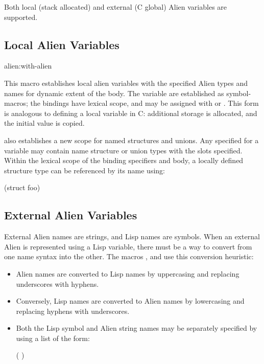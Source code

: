Both local (stack allocated) and external (C global) Alien variables are
supported.


\subsection{Local Alien Variables}

\begin{defmac}{alien:}{with-alien}{ }
  
  This macro establishes local alien variables with the specified
  Alien types and names for dynamic extent of the body.  The variable
   are established as symbol-macros; the bindings have
  lexical scope, and may be assigned with  or .
  This form is analogous to defining a local variable in C: additional
  storage is allocated, and the initial value is copied.
  
   also establishes a new scope for named structures
  and unions.  Any  specified for a variable may contain
  name structure or union types with the slots specified.  Within the
  lexical scope of the binding specifiers and body, a locally defined
  structure type  can be referenced by its name using:
\begin{lisp}
  (struct foo)
\end{lisp}
\end{defmac}


\subsection{External Alien Variables} 
\label{external-aliens}

External Alien names are strings, and Lisp names are symbols.  When an
external Alien is represented using a Lisp variable, there must be a
way to convert from one name syntax into the other.  The macros
,  and
 use this conversion heuristic:
\begin{itemize}
\item Alien names are converted to Lisp names by uppercasing and
  replacing underscores with hyphens.
  
\item Conversely, Lisp names are converted to Alien names by
  lowercasing and replacing hyphens with underscores.
  
\item Both the Lisp symbol and Alien string names may be separately
  specified by using a list of the form:
\begin{lisp}
  ( )
\end{lisp}
\end{itemize}

